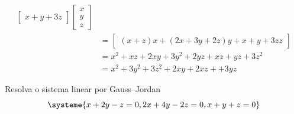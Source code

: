 \documentclass[a4paper,12pt,fleqn]{article}
\begin{document}
\begin{answer}
\begin{align*}
\begin{bmatrix}
      x + y + 3z
    \end{bmatrix}
    \begin{bmatrix}
      x \\ y \\ z
    \end{bmatrix}
    \\[2mm]
    & =
    \begin{bmatrix}
      (x + z)x +
      (2x + 3y + 2z)y +
      {x + y + 3z}z
    \end{bmatrix}
    \\[2mm]
    & =
      x^2 + xz +
      2xy + 3y^2 + 2yz +
      xz + yz + 3z^2
    \\[2mm]
    & =
      x^2 + 3y^2 + 3z^2 + 2xy + 2xz + + 3yz
  \end{align*}
\end{answer}

Resolva o sistema linear por Gauss--Jordan
\[
  \systeme{
     x + 2y -  z = 0,
    2x + 4y - 2z = 0,
     x +  y +  z = 0
  }
\]
\end{document}
